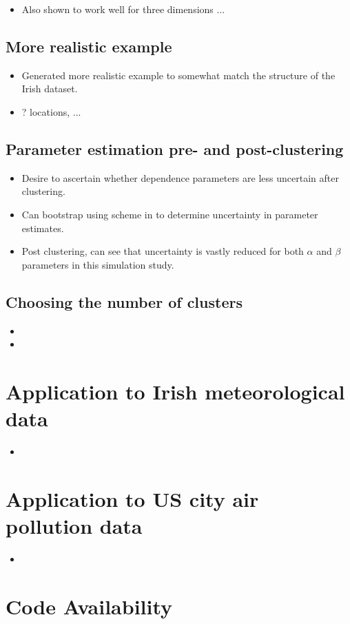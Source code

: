 \documentclass{article}
\numberwithin{equation}{section}
\begin{document}
\begin{itemize}
    \item Also shown to work well for three dimensions ...
\end{itemize}

\subsection{More realistic example}

\begin{itemize}
    \item Generated more realistic example to somewhat match the structure of the Irish dataset. 
    \item ? locations, ... 
\end{itemize}

\subsection{Parameter estimation pre- and post-clustering}

\begin{itemize}
    \item Desire to ascertain whether dependence parameters are less uncertain after clustering. 
    \item Can bootstrap using scheme in \cite{Heffernan2004} to determine uncertainty in parameter estimates. 
    \item Post clustering, can see that uncertainty is vastly reduced for both $\alpha$ and $\beta$ parameters in this simulation study. 
\end{itemize}

\subsection{Choosing the number of clusters}

\begin{itemize}
    \item {}
    \item {}
\end{itemize}

\section{Application to Irish meteorological data}

\begin{itemize}
    \item 
\end{itemize}

\section{Application to US city air pollution data}

\begin{itemize}
    \item 
\end{itemize}

\section*{Code Availability}

\newpage

\end{document}
